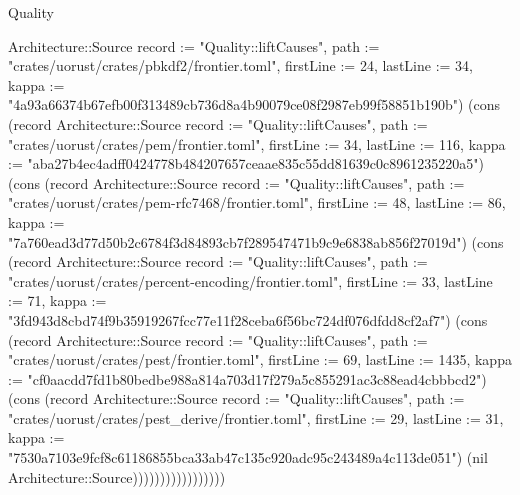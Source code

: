 \begin{lexlean}{Quality}
\begin{semanticmodule}
{Architecture::Source {record := "Quality::liftCauses", path := "crates/uorust/crates/pbkdf2/frontier.toml", firstLine := 24, lastLine := 34, kappa := "4a93a66374b67efb00f313489cb736d8a4b90079ce08f2987eb99f58851b190b"}) (cons (record Architecture::Source {record := "Quality::liftCauses", path := "crates/uorust/crates/pem/frontier.toml", firstLine := 34, lastLine := 116, kappa := "aba27b4ec4adff0424778b484207657ceaae835c55dd81639c0c8961235220a5"}) (cons (record Architecture::Source {record := "Quality::liftCauses", path := "crates/uorust/crates/pem-rfc7468/frontier.toml", firstLine := 48, lastLine := 86, kappa := "7a760ead3d77d50b2c6784f3d84893cb7f289547471b9c9e6838ab856f27019d"}) (cons (record Architecture::Source {record := "Quality::liftCauses", path := "crates/uorust/crates/percent-encoding/frontier.toml", firstLine := 33, lastLine := 71, kappa := "3fd943d8cbd74f9b35919267fcc77e11f28ceba6f56bc724df076dfdd8cf2af7"}) (cons (record Architecture::Source {record := "Quality::liftCauses", path := "crates/uorust/crates/pest/frontier.toml", firstLine := 69, lastLine := 1435, kappa := "cf0aacdd7fd1b80bedbe988a814a703d17f279a5c855291ac3c88ead4cbbbcd2"}) (cons (record Architecture::Source {record := "Quality::liftCauses", path := "crates/uorust/crates/pest_derive/frontier.toml", firstLine := 29, lastLine := 31, kappa := "7530a7103e9fcf8c61186855bca33ab47c135c920adc95c243489a4c113de051"}) (nil Architecture::Source)))))))))))))))))
}


\end{semanticmodule}
\end{lexlean}
